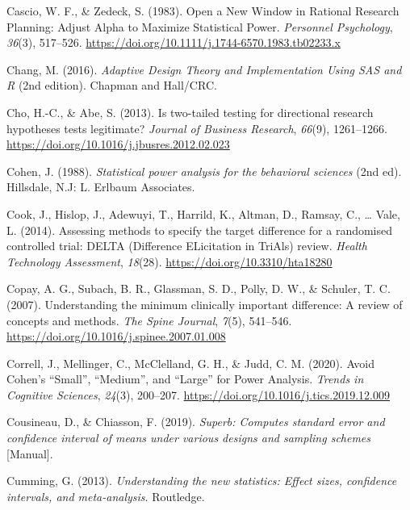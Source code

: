 \documentclass[
  english,
  ,jou, a4paper,floatsintext]{apa6}
\newlength{\cslhangindent}
\newenvironment{cslreferences}%
  {\setlength{\parindent}{0pt}%
  \everypar{\setlength{\hangindent}{\cslhangindent}}\ignorespaces}%
  {\par}
\begin{document}
\begin{cslreferences}
\leavevmode\hypertarget{ref-cascio_open_1983}{}%
Cascio, W. F., \& Zedeck, S. (1983). Open a New Window in Rational Research Planning: Adjust Alpha to Maximize Statistical Power. \emph{Personnel Psychology}, \emph{36}(3), 517--526. \url{https://doi.org/10.1111/j.1744-6570.1983.tb02233.x}

\leavevmode\hypertarget{ref-chang_adaptive_2016}{}%
Chang, M. (2016). \emph{Adaptive Design Theory and Implementation Using SAS and R} (2nd edition). Chapman and Hall/CRC.

\leavevmode\hypertarget{ref-cho_is_2013}{}%
Cho, H.-C., \& Abe, S. (2013). Is two-tailed testing for directional research hypotheses tests legitimate? \emph{Journal of Business Research}, \emph{66}(9), 1261--1266. \url{https://doi.org/10.1016/j.jbusres.2012.02.023}

\leavevmode\hypertarget{ref-cohen_statistical_1988}{}%
Cohen, J. (1988). \emph{Statistical power analysis for the behavioral sciences} (2nd ed). Hillsdale, N.J: L. Erlbaum Associates.

\leavevmode\hypertarget{ref-cook_assessing_2014}{}%
Cook, J., Hislop, J., Adewuyi, T., Harrild, K., Altman, D., Ramsay, C., \ldots{} Vale, L. (2014). Assessing methods to specify the target difference for a randomised controlled trial: DELTA (Difference ELicitation in TriAls) review. \emph{Health Technology Assessment}, \emph{18}(28). \url{https://doi.org/10.3310/hta18280}

\leavevmode\hypertarget{ref-copay_understanding_2007}{}%
Copay, A. G., Subach, B. R., Glassman, S. D., Polly, D. W., \& Schuler, T. C. (2007). Understanding the minimum clinically important difference: A review of concepts and methods. \emph{The Spine Journal}, \emph{7}(5), 541--546. \url{https://doi.org/10.1016/j.spinee.2007.01.008}

\leavevmode\hypertarget{ref-correll_avoid_2020}{}%
Correll, J., Mellinger, C., McClelland, G. H., \& Judd, C. M. (2020). Avoid Cohen's ``Small'', ``Medium'', and ``Large'' for Power Analysis. \emph{Trends in Cognitive Sciences}, \emph{24}(3), 200--207. \url{https://doi.org/10.1016/j.tics.2019.12.009}

\leavevmode\hypertarget{ref-cousineau_superb_2019}{}%
Cousineau, D., \& Chiasson, F. (2019). \emph{Superb: Computes standard error and confidence interval of means under various designs and sampling schemes} {[}Manual{]}.

\leavevmode\hypertarget{ref-cumming_understanding_2013}{}%
Cumming, G. (2013). \emph{Understanding the new statistics: Effect sizes, confidence intervals, and meta-analysis}. Routledge.


\end{cslreferences}
\end{document}
